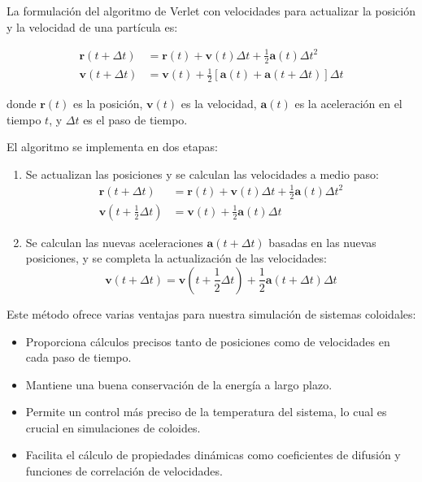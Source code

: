 \documentclass[twocolumn]{article}
\begin{document}
La formulación del algoritmo de Verlet con velocidades para actualizar la posición y la velocidad de una partícula es:

\begin{align}
    \mathbf{r}(t + \Delta t) &= \mathbf{r}(t) + \mathbf{v}(t)\Delta t + \frac{1}{2}\mathbf{a}(t)\Delta t^2 \\
    \mathbf{v}(t + \Delta t) &= \mathbf{v}(t) + \frac{1}{2}[\mathbf{a}(t) + \mathbf{a}(t + \Delta t)]\Delta t
\end{align}

donde $\mathbf{r}(t)$ es la posición, $\mathbf{v}(t)$ es la velocidad, $\mathbf{a}(t)$ es la aceleración en el tiempo $t$, y $\Delta t$ es el paso de tiempo.

El algoritmo se implementa en dos etapas:
\begin{enumerate}
    \item Se actualizan las posiciones y se calculan las velocidades a medio paso:
    \begin{align}
        \mathbf{r}(t + \Delta t) &= \mathbf{r}(t) + \mathbf{v}(t)\Delta t + \frac{1}{2}\mathbf{a}(t)\Delta t^2 \\
        \mathbf{v}(t + \frac{1}{2}\Delta t) &= \mathbf{v}(t) + \frac{1}{2}\mathbf{a}(t)\Delta t
    \end{align}
    \item Se calculan las nuevas aceleraciones $\mathbf{a}(t + \Delta t)$ basadas en las nuevas posiciones, y se completa la actualización de las velocidades:
    \begin{equation}
        \mathbf{v}(t + \Delta t) = \mathbf{v}(t + \frac{1}{2}\Delta t) + \frac{1}{2}\mathbf{a}(t + \Delta t)\Delta t
    \end{equation}
\end{enumerate}

Este método ofrece varias ventajas para nuestra simulación de sistemas coloidales:
\begin{itemize}
    \item Proporciona cálculos precisos tanto de posiciones como de velocidades en cada paso de tiempo.
    \item Mantiene una buena conservación de la energía a largo plazo.
    \item Permite un control más preciso de la temperatura del sistema, lo cual es crucial en simulaciones de coloides.
    \item Facilita el cálculo de propiedades dinámicas como coeficientes de difusión y funciones de correlación de velocidades.
\end{itemize}
\end{document}
